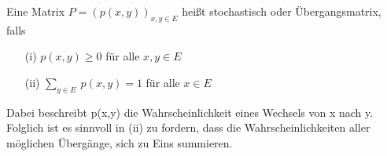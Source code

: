 Eine Matrix $P=(p(x,y))_{x,y \in E}$ heißt stochastisch oder Übergangsmatrix, falls
\begin{itemize}
\item[(i)] $p(x,y) \ge 0$ für alle $x,y \in E$
\item[(ii)] $\sum_{y \in E} \: p(x,y) = 1$ für alle $x \in E$
\end{itemize}
Dabei beschreibt p(x,y) die Wahrscheinlichkeit eines Wechsels von x nach y. Folglich ist es sinnvoll in (ii) zu fordern, dass die Wahrscheinlichkeiten aller möglichen Übergänge, sich zu Eins summieren.
